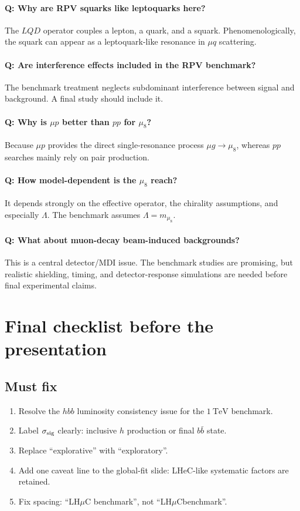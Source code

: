\documentclass[11pt,a4paper]{article}
\newcommand{\LHmuC}{LH\ensuremath{\mu}C}
\newcommand{\tev}{\ensuremath{~\mathrm{TeV}}}
\begin{document}
\paragraph{Q: Why are RPV squarks like leptoquarks here?}
The \(LQD\) operator couples a lepton, a quark, and a squark.  Phenomenologically, the squark
can appear as a leptoquark-like resonance in \(\mu q\) scattering.

\paragraph{Q: Are interference effects included in the RPV benchmark?}
The benchmark treatment neglects subdominant interference between signal and background.  A
final study should include it.

\paragraph{Q: Why is \(\mu p\) better than \(pp\) for \(\mu_8\)?}
Because \(\mu p\) provides the direct single-resonance process \(\mu g\to\mu_8\), whereas \(pp\)
searches mainly rely on pair production.

\paragraph{Q: How model-dependent is the \(\mu_8\) reach?}
It depends strongly on the effective operator, the chirality assumptions, and especially \(\Lambda\).
The benchmark assumes \(\Lambda=m_{\mu_8}\).

\paragraph{Q: What about muon-decay beam-induced backgrounds?}
This is a central detector/MDI issue.  The benchmark studies are promising, but realistic shielding,
timing, and detector-response simulations are needed before final experimental claims.

\section{Final checklist before the presentation}

\subsection*{Must fix}
\begin{enumerate}[leftmargin=*]
  \item Resolve the \(hbb\) luminosity consistency issue for the \(1\tev\) benchmark.
  \item Label \(\sigma_{\rm sig}\) clearly: inclusive \(h\) production or final \(b\bar b\) state.
  \item Replace ``explorative'' with ``exploratory''.
  \item Add one caveat line to the global-fit slide: LHeC-like systematic factors are retained.
  \item Fix spacing: ``\LHmuC{} benchmark'', not ``\LHmuC{}benchmark''.
\end{enumerate}
\end{document}
